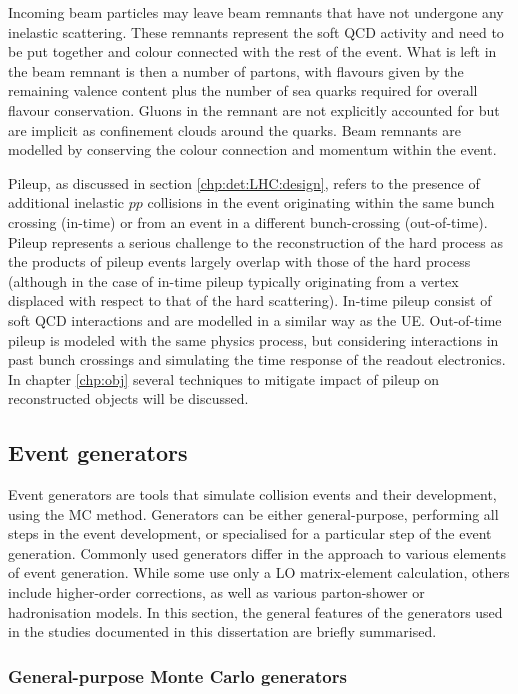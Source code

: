 Incoming beam particles may leave beam remnants that have not undergone any inelastic scattering. These remnants represent the soft QCD activity and need to be put together and colour connected with the rest of the event. What is left in the beam remnant is then a number of partons, with flavours given by the remaining valence content plus the number of sea quarks required for overall flavour conservation. Gluons in the remnant are not explicitly accounted for but are implicit as confinement clouds around the quarks.  Beam remnants are modelled by conserving the colour connection and momentum within the event.\par
Pileup, as discussed in section \ref{chp:det:LHC:design}, refers to the presence of additional inelastic $pp$ collisions in the event originating within the same bunch crossing (in-time) or from an event in a different bunch-crossing (out-of-time). Pileup represents a serious challenge to the reconstruction of the hard process as the products of pileup events largely overlap with those of the hard process (although in the case of in-time pileup typically originating from a vertex displaced with respect to that of the hard scattering). In-time pileup consist of soft QCD interactions and are modelled in a similar way as the UE. Out-of-time pileup is modeled with the same physics process, but considering interactions in past bunch crossings and simulating the time response of the readout electronics. In chapter \ref{chp:obj} several techniques to mitigate impact of pileup on reconstructed objects will be discussed.


\subsection{Event generators}

Event generators are tools that simulate collision events and their development, using the MC method. Generators can be either general-purpose, performing all steps in the event development, or specialised for a particular step of the event generation. Commonly used generators differ in the approach to various elements of event generation. While some use only a LO matrix-element calculation, others include higher-order corrections, as well as various parton-shower or hadronisation models. In this section, the general features of the generators used in the studies documented in this dissertation are briefly summarised.

\subsubsection{General-purpose Monte Carlo generators}

